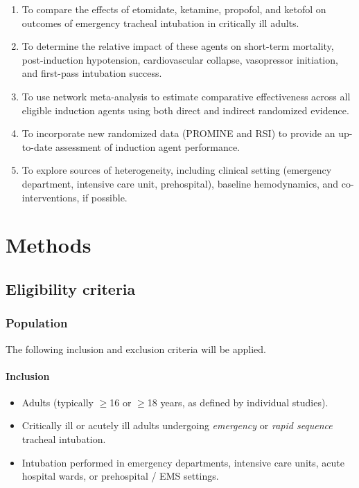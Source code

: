 \documentclass[11pt]{article}
\begin{document}
\begin{enumerate}[label=\arabic*.]
  \item To compare the effects of etomidate, ketamine, propofol, and ketofol on outcomes of emergency tracheal intubation in critically ill adults.
  \item To determine the relative impact of these agents on short-term mortality, post-induction hypotension, cardiovascular collapse, vasopressor initiation, and first-pass intubation success.
  \item To use network meta-analysis to estimate comparative effectiveness across all eligible induction agents using both direct and indirect randomized evidence.
  \item To incorporate new randomized data (PROMINE and RSI) to provide an up-to-date assessment of induction agent performance.
  \item To explore sources of heterogeneity, including clinical setting (emergency department, intensive care unit, prehospital), baseline hemodynamics, and co-interventions, if possible.
\end{enumerate}

\section{Methods}

\subsection{Eligibility criteria}

\subsubsection{Population}

The following inclusion and exclusion criteria will be applied.

\paragraph{Inclusion}

\begin{itemize}
  \item Adults (typically $\geq$16 or $\geq$18 years, as defined by individual studies).
  \item Critically ill or acutely ill adults undergoing \emph{emergency} or \emph{rapid sequence} tracheal intubation.
  \item Intubation performed in emergency departments, intensive care units, acute hospital wards, or prehospital / EMS settings.
\end{itemize}
\end{document}
